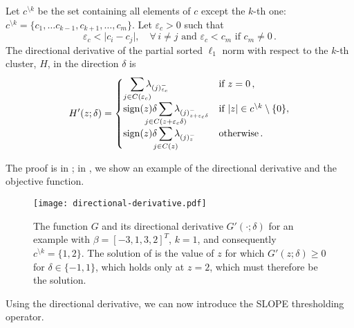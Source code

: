 \begin{theorem}\label{thm:sl1-directional-derivative}
  Let \(c^{\setminus k}\) be the set containing all elements of $c$ except the $k$-th one: $c^{\setminus k} =  \{c_1, \ldots c_{k-1}, c_{k+1}, \ldots, c_m \}$.
  Let $\varepsilon_c > 0$ such that
  \begin{equation}
    \label{eq:epsilon-c}
    \varepsilon_c < \big| c_i - c_j\big| , \quad \forall\, i \neq j \text{ and } \varepsilon_c < c_m \text{ if } c_m \neq 0 \, .
  \end{equation}
  The directional derivative of the partial sorted $\ell_1$ norm with respect to the $k$-th cluster, \(H\), in the direction \(\delta\) is
  \[
    H'(z; \delta) =
    \begin{cases}
      \smashoperator[r]{\sum_{j \in C(\varepsilon_c )}} \lambda_{(j)^-_{\varepsilon_c }}
       & \text{if } z = 0 \, ,                                \\
      \sign(z)\delta\smashoperator{\sum_{j \in C(z + {\varepsilon_c} \delta)}} \lambda_{(j)^-_{z + {\varepsilon_c}\delta}}
       & \text{if } |z| \in c^{\setminus k} \setminus \{0\} , \\
      \sign(z)\delta\smashoperator{\sum_{j \in C(z)}} \lambda_{(j)^-_{z}}
       & \text{otherwise} \, .
    \end{cases}
  \]
\end{theorem}
The proof is in ; in , we show an example of the directional
derivative and the objective function.

\begin{figure}[htb]
  \centering
  \texttt{[image: directional-derivative.pdf]}
  \caption{%
  The function \(G\) and its directional derivative \(G'( \cdot ; \delta)\) for
  an example with \(\beta = [-3, 1, 3, 2]^T\), \(k = 1\), and consequently
  \(c^{\setminus k} = \{1, 2\}\). The solution of  is the value of \(z\) for
  which \(G'(z; \delta) \geq 0 \) for \(\delta \in \{-1, 1\}\), which holds only
  at \(z = 2\), which must therefore be the solution.
  }
  \label{fig:directional-derivative}
\end{figure}

Using the directional derivative, we can now introduce the SLOPE thresholding operator.

